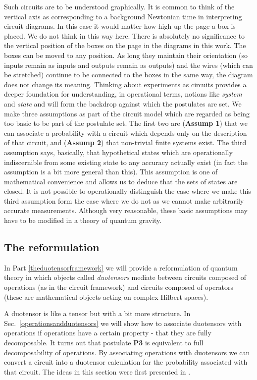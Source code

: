 \documentclass[10pt]{article}
\begin{document}
Such circuits are to be understood graphically.  It is common to think of the vertical axis as corresponding to a background Newtonian time in interpreting circuit diagrams.   In this case it would matter how high up the page a box is placed.  We do not think in this way here.  There is absolutely no significance to the vertical position of the boxes on the page in the diagrams in this work.  The boxes can be moved to any position.  As long they maintain their orientation (so inputs remain as inputs and outputs remain as outputs) and the wires (which can be stretched) continue to be connected to the boxes in the same way, the diagram does not change its meaning.   Thinking about experiments as circuits provides a deeper foundation for understanding, in operational terms, notions like {\it system} and {\it state} and will form the backdrop against which the postulates are set.   We make three assumptions as part of the circuit model which are regarded as being too basic to be part of the postulate set.  The first two are ({\bf Assump 1}) that we can associate a probability with a circuit which depends only on the description of that circuit, and ({\bf Assump 2}) that non-trivial finite systems exist.  The third assumption says, basically, that hypothetical states  which are operationally indiscernible from some existing state to any accuracy actually exist (in fact the assumption is a bit more general than this). This assumption is one of mathematical convenience and allows us to deduce that the sets of states are closed.  It is not possible to operationally distinguish the case where we make this third assumption form the case where we do not as we cannot make arbitrarily accurate measurements.   Although very reasonable, these basic assumptions may have to be modified in a theory of quantum gravity.



\subsection{The reformulation}


In Part \ref{theduotensorframework} we will provide a reformulation of quantum theory in which objects called \emph{duotensors} mediate between circuits composed of operations (as in the circuit framework) and circuits composed of operators (these are mathematical objects acting on complex Hilbert spaces).

A duotensor \cite{hardy2010formalism} is like a tensor but with a bit more structure.  In Sec.\ \ref{operationsandduotensors} we will show how to associate duotensors with operations if operations have a certain property - that they are fully decomposable. It turns out that postulate {\bf P3} is equivalent to full decomposability of operations.   By associating operations with duotensors we can convert a circuit into a duotensor calculation for the probability associated with that circuit.  The ideas in this section were first presented in \cite{hardy2010formalism}.
\end{document}
